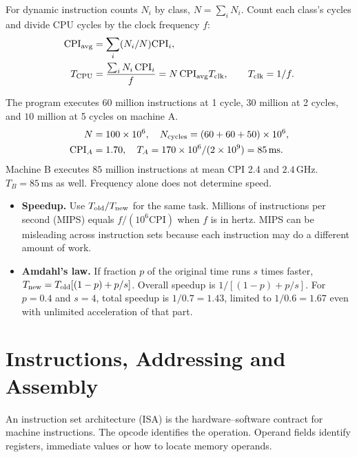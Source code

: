 \documentclass[12pt,a4paper]{article}
\begin{document}
For dynamic instruction counts $N_i$ by class, $N=\sum_i N_i$. Count each class's cycles and divide CPU cycles by the clock frequency $f$:
\[
\begin{aligned}
\mathrm{CPI}_{\rm avg}&=\sum_i(N_i/N)\mathrm{CPI}_i,\\
T_{\rm CPU}&=\frac{\sum_i N_i\,\mathrm{CPI}_i}{f}
            =N\,\mathrm{CPI}_{\rm avg}T_{\rm clk},\qquad T_{\rm clk}=1/f .
\end{aligned}
\]
\begin{tcolorbox}[examplebox,title={Compare two implementations on one workload}]
The program executes $60$ million instructions at 1 cycle, $30$ million at 2 cycles, and $10$ million at 5 cycles on machine A.
\[
\begin{aligned}
N&=100\times10^6,\quad
N_{\rm cycles}=(60+60+50)\times10^6,\\
\mathrm{CPI}_A&=1.70,\quad T_A=170\times10^6/(2\times10^9)=85\,\mathrm{ms}.
\end{aligned}
\]
Machine B executes $85$ million instructions at mean CPI 2.4 and $2.4\,\mathrm{GHz}$. $T_B=85\,\mathrm{ms}$ as well. Frequency alone does not determine speed.
\end{tcolorbox}
\begin{itemize}[leftmargin=*,itemsep=3pt]
\item \textbf{Speedup.} Use $T_{\rm old}/T_{\rm new}$ for the same task. Millions of instructions per second (MIPS) equals $f/(10^6\mathrm{CPI})$ when $f$ is in hertz. MIPS can be misleading across instruction sets because each instruction may do a different amount of work.
\item \textbf{Amdahl's law.} If fraction $p$ of the original time runs $s$ times faster, $T_{\rm new}=T_{\rm old}[(1-p)+p/s]$. Overall speedup is $1/[(1-p)+p/s]$. For $p=0.4$ and $s=4$, total speedup is $1/0.7=1.43$, limited to $1/0.6=1.67$ even with unlimited acceleration of that part.
\end{itemize}

\section{Instructions, Addressing and Assembly}
\begin{tcolorbox}[defbox,title={Instruction set architecture}]
An instruction set architecture (ISA) is the hardware--software contract for machine instructions. The opcode identifies the operation. Operand fields identify registers, immediate values or how to locate memory operands.
\end{tcolorbox}
\end{document}

